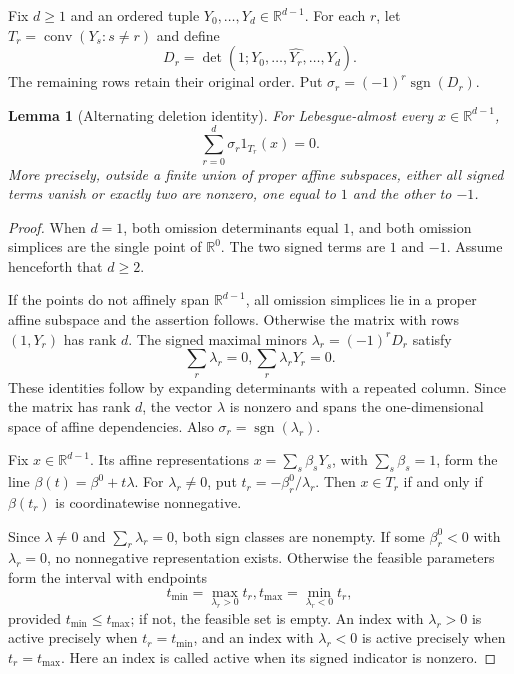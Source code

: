 \documentclass[11pt]{article}
\newtheorem{lemma}[theorem]{Lemma}
\theoremstyle{remark}
\newcommand{\R}{\mathbb{R}}
\newcommand{\conv}{\operatorname{conv}}
\newcommand{\sgn}{\operatorname{sgn}}
\newcommand{\one}{1}
\begin{document}
\begin{aiblock}
Fix $d\geq1$ and an ordered tuple $Y_0,\ldots,Y_d\in\R^{d-1}$. For each $r$, let $T_r=\conv(Y_s:s\neq r)$ and define
\begin{equation}
D_r=\det(1;Y_0,\ldots,\widehat{Y_r},\ldots,Y_d).
\end{equation}
The remaining rows retain their original order. Put $\sigma_r=(-1)^r\sgn(D_r)$.

\begin{lemma}[Alternating deletion identity]
\label{lem:cocycle}
For Lebesgue-almost every $x\in\R^{d-1}$,
\begin{equation}
\sum_{r=0}^d\sigma_r\one_{T_r}(x)=0.
\end{equation}
More precisely, outside a finite union of proper affine subspaces, either all signed terms vanish or exactly two are nonzero, one equal to $1$ and the other to $-1$.
\end{lemma}

\begin{proof}
When $d=1$, both omission determinants equal $1$, and both omission simplices are the single point of $\R^0$. The two signed terms are $1$
and $-1$. Assume henceforth that $d\geq2$.

If the points do not affinely span $\R^{d-1}$, all omission simplices lie in a proper affine subspace and the assertion follows. Otherwise the matrix with rows $(1,Y_r)$ has rank $d$. The signed maximal minors
$\lambda_r=(-1)^rD_r$ satisfy
$$\sum_r\lambda_r=0,\sum_r\lambda_rY_r=0.$$
These identities follow by expanding determinants with a repeated column. Since the matrix has rank $d$, the vector $\lambda$ is nonzero and spans the one-dimensional space of affine dependencies. Also
$\sigma_r=\sgn(\lambda_r)$.

Fix $x\in\R^{d-1}$. Its affine representations $x=\sum_s\beta_sY_s$, with $\sum_s\beta_s=1$, form the line
$\beta(t)=\beta^0+t\lambda$. For $\lambda_r\neq0$, put $t_r=-\beta_r^0/\lambda_r$. Then $x\in T_r$ if and only if $\beta(t_r)$ is coordinatewise nonnegative.

Since $\lambda\neq0$ and $\sum_r\lambda_r=0$, both sign classes are nonempty. If some $\beta_r^0<0$ with $\lambda_r=0$, no nonnegative representation exists. Otherwise the feasible parameters form the
interval with endpoints
$$t_{\min}=\max_{\lambda_r>0}t_r, t_{\max}=\min_{\lambda_r<0}t_r,$$
provided $t_{\min}\leq t_{\max}$; if not, the feasible set is empty. An index with $\lambda_r>0$ is active precisely when $t_r=t_{\min}$, and an index with $\lambda_r<0$ is active precisely when $t_r=t_{\max}$. Here an index is called active when its signed indicator is nonzero.


\end{proof}
\end{aiblock}
\end{document}
